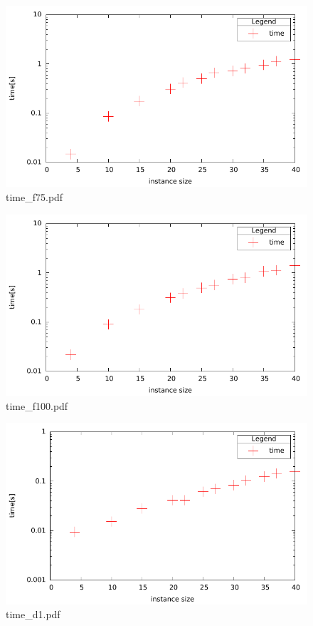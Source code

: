 \documentclass[12pt,a4paper]{article}
\begin{document}
\begin{figure}[H]
\caption{time\_f75.pdf }
\includegraphics{./time_f75.pdf}
\end{figure}

\begin{figure}[H]
\caption{time\_f100.pdf }
\includegraphics{./time_f100.pdf}
\end{figure}

\begin{figure}[H]
\caption{time\_d1.pdf }
\includegraphics{./time_d1.pdf}
\end{figure}
\end{document}
